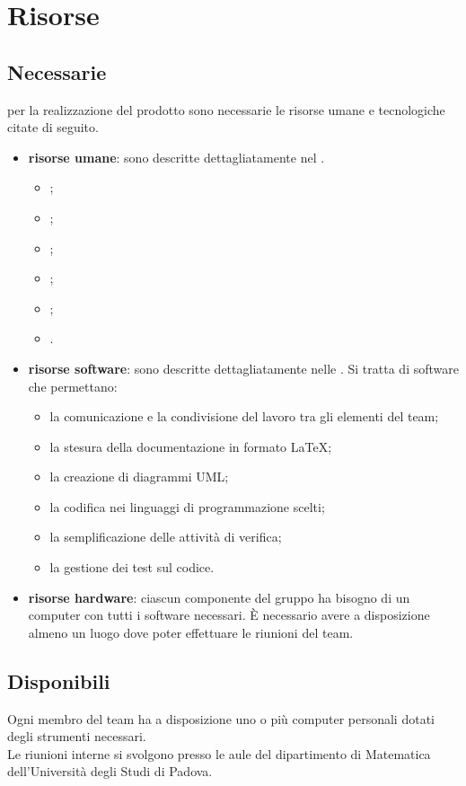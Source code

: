 \documentclass[../PianoDiQualifica.tex]{subfiles}
\begin{document}
\section{Risorse}
\subsection{Necessarie}
per la realizzazione del prodotto sono necessarie le risorse umane e tecnologiche citate di seguito.
\begin{itemize}
	\item \textbf{risorse umane}: sono descritte dettagliatamente nel \pianodiprogetto. 
	\begin{itemize}
		\item \responsabilediprogetto;
		\item \amministratore;
		\item \analista;
		\item \progettista;
		\item \programmatore;
		\item \verificatore.
	\end{itemize}
	\item \textbf{risorse software}: sono descritte dettagliatamente nelle \normediprogetto.
	Si tratta di software che permettano:
	\begin{itemize}
		\item la comunicazione e la condivisione del lavoro tra gli elementi del team;
		\item la stesura della documentazione in formato LaTeX;
		\item la creazione di diagrammi UML;
		\item la codifica nei linguaggi di programmazione scelti;
		\item la semplificazione delle attività di verifica;
		\item la gestione dei test sul codice.
	\end{itemize}
\item \textbf{risorse hardware}: ciascun componente del gruppo ha bisogno di un computer con tutti i software necessari. È necessario avere a disposizione almeno un luogo dove poter effettuare le riunioni del team.
\end{itemize}
\subsection{Disponibili}
Ogni membro del team ha a disposizione uno o più computer personali dotati degli strumenti necessari. \\
Le riunioni interne si svolgono presso le aule del dipartimento di Matematica dell'Università degli Studi di Padova.
\end{document}
